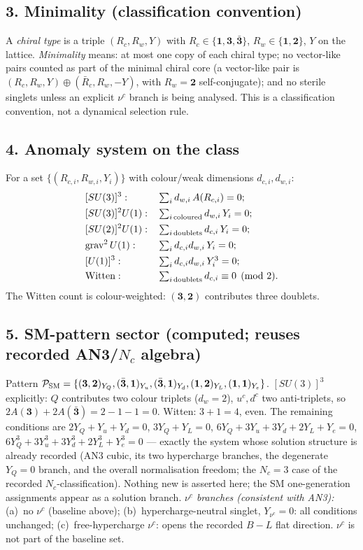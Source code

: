 \subsection*{3. Minimality (classification convention)}
A \emph{chiral type} is a triple $(R_c,R_w,Y)$ with
$R_c\in\{\mathbf 1,\mathbf 3,\bar{\mathbf 3}\}$,
$R_w\in\{\mathbf 1,\mathbf 2\}$, $Y$ on the lattice.
\emph{Minimality} means: at most one copy of each chiral type;
no vector-like pairs counted as part of the minimal chiral core
(a vector-like pair is $(R_c,R_w,Y)\oplus(\bar R_c,R_w,-Y)$, with
$R_w=\mathbf 2$ self-conjugate); and no sterile singlets unless an
explicit $\nu^c$ branch is being analysed.
This is a classification convention, not a dynamical selection
rule.

\subsection*{4. Anomaly system on the class}
For a set $\{(R_{c,i},R_{w,i},Y_i)\}$ with colour/weak dimensions
$d_{c,i},d_{w,i}$:
\begin{align*}
&[SU(3)]^3: && \textstyle\sum_i d_{w,i}\,A(R_{c,i})=0;\\
&[SU(3)]^2U(1): && \textstyle\sum_{i\,\rm coloured} d_{w,i}\,Y_i=0;\\
&[SU(2)]^2U(1): && \textstyle\sum_{i\,\rm doublets} d_{c,i}\,Y_i=0;\\
&\text{grav}^2\,U(1): && \textstyle\sum_i d_{c,i}d_{w,i}\,Y_i=0;\\
&[U(1)]^3: && \textstyle\sum_i d_{c,i}d_{w,i}\,Y_i^3=0;\\
&\text{Witten}: && \textstyle\sum_{i\,\rm doublets} d_{c,i}
  \equiv 0 \pmod 2 .
\end{align*}
The Witten count is colour-weighted: $(\mathbf 3,\mathbf 2)$
contributes three doublets.

\subsection*{5. SM-pattern sector (computed; reuses recorded
AN3/$N_c$ algebra)}
Pattern $\mathcal P_{\rm SM}=
\{(\mathbf 3,\mathbf 2)_{Y_Q},(\bar{\mathbf 3},\mathbf 1)_{Y_u},
(\bar{\mathbf 3},\mathbf 1)_{Y_d},(\mathbf 1,\mathbf 2)_{Y_L},
(\mathbf 1,\mathbf 1)_{Y_e}\}$.
$[SU(3)]^3$ explicitly: $Q$ contributes two colour triplets
($d_w=2$), $u^c,d^c$ two anti-triplets, so
$2A(\mathbf 3)+2A(\bar{\mathbf 3})=2-1-1=0$.
Witten: $3+1=4$, even.
The remaining conditions are
$2Y_Q+Y_u+Y_d=0$, $3Y_Q+Y_L=0$,
$6Y_Q+3Y_u+3Y_d+2Y_L+Y_e=0$,
$6Y_Q^3+3Y_u^3+3Y_d^3+2Y_L^3+Y_e^3=0$ ---
exactly the system whose solution structure is already recorded
(AN3 cubic, its two hypercharge branches, the degenerate $Y_Q=0$
branch, and the overall normalisation freedom; the $N_c=3$ case of
the recorded $N_c$-classification).
Nothing new is asserted here; the SM one-generation assignments
appear as a solution branch.
\emph{$\nu^c$ branches (consistent with AN3):}
(a)~no $\nu^c$ (baseline above);
(b)~hypercharge-neutral singlet, $Y_{\nu^c}=0$: all conditions
unchanged;
(c)~free-hypercharge $\nu^c$: opens the recorded $B-L$ flat
direction.
$\nu^c$ is not part of the baseline set.

